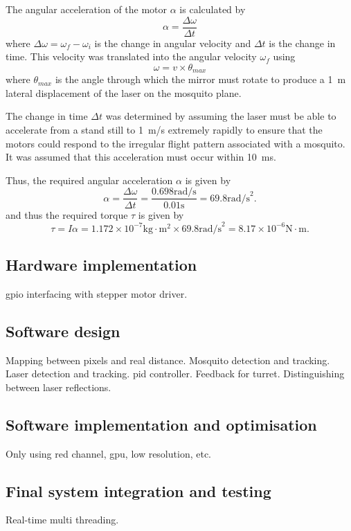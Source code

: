 The angular acceleration of the motor $\alpha$ is calculated by
\begin{equation}
    \alpha = \frac{\Delta\omega}{\Delta t}
    \label{eq:angular_acceleration}
\end{equation}
where $\Delta\omega = \omega_f - \omega_i$ is the change in angular velocity and $\Delta t$ is the change in time.  This velocity was translated into the angular velocity $\omega_f$ using
\begin{equation}
    \omega = v \times \theta_{max}
    \label{eq:angular_velocity}
\end{equation}
where $\theta_{max}$ is the angle through which the mirror must rotate to produce a 1~m lateral displacement of the laser on the mosquito plane.

The change in time $\Delta t$ was determined by assuming the laser must be able to accelerate from a stand still to 1~m/s extremely rapidly to ensure that the motors could respond to the irregular flight pattern associated with a mosquito. It was assumed that this acceleration must occur within 10~ms.

Thus, the required angular acceleration $\alpha$ is given by
\begin{equation}
    \alpha = \frac{\Delta\omega}{\Delta t} = \frac{0.698 \text{rad/s}}{0.01 \text{s}} = 69.8 \text{rad/s}^2.
    \label{eq:angular_acceleration_calculation}
\end{equation}
and thus the required torque $\tau$ is given by
\begin{equation}
    \tau = I\alpha = 1.172 \times 10^{-7} \text{kg} \cdot \text{m}^2 \times 69.8 \text{rad/s}^2 = 8.17 \times 10^{-6} \text{N} \cdot \text{m}.
    \label{eq:torque_calculation}
\end{equation}


\subsection{Hardware implementation}
\gls{gpio} interfacing with stepper motor driver.


\subsection{Software design}
Mapping between pixels and real distance. Mosquito detection and tracking. Laser detection and tracking. \gls{pid} controller. Feedback for turret. Distinguishing between laser reflections.


\subsection{Software implementation and optimisation}
Only using red channel, \gls{gpu}, low resolution, etc.


\subsection{Final system integration and testing}
Real-time multi threading.

\newpage


